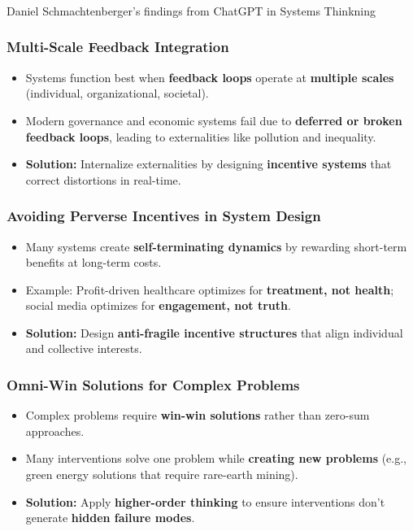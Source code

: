 \begin{frame}[fragile]\frametitle{}
\begin{center}
{\Large Daniel Schmachtenberger's findings from ChatGPT in Systems Thinkning}

\end{center}
\end{frame}

\begin{frame}[fragile]\frametitle{Multi-Scale Feedback Integration}
	\begin{itemize}
	\item Systems function best when \textbf{feedback loops} operate at \textbf{multiple scales} (individual, organizational, societal).
	\item Modern governance and economic systems fail due to \textbf{deferred or broken feedback loops}, leading to externalities like pollution and inequality.
	\item \textbf{Solution:} Internalize externalities by designing \textbf{incentive systems} that correct distortions in real-time.
	\end{itemize}
\end{frame}

\begin{frame}[fragile]\frametitle{Avoiding Perverse Incentives in System Design}
	\begin{itemize}
	\item Many systems create \textbf{self-terminating dynamics} by rewarding short-term benefits at long-term costs.
	\item Example: Profit-driven healthcare optimizes for \textbf{treatment, not health}; social media optimizes for \textbf{engagement, not truth}.
	\item \textbf{Solution:} Design \textbf{anti-fragile incentive structures} that align individual and collective interests.
	\end{itemize}
\end{frame}

\begin{frame}[fragile]\frametitle{Omni-Win Solutions for Complex Problems}
	\begin{itemize}
	\item Complex problems require \textbf{win-win solutions} rather than zero-sum approaches.
	\item Many interventions solve one problem while \textbf{creating new problems} (e.g., green energy solutions that require rare-earth mining).
	\item \textbf{Solution:} Apply \textbf{higher-order thinking} to ensure interventions don’t generate \textbf{hidden failure modes}.
	\end{itemize}
\end{frame}

